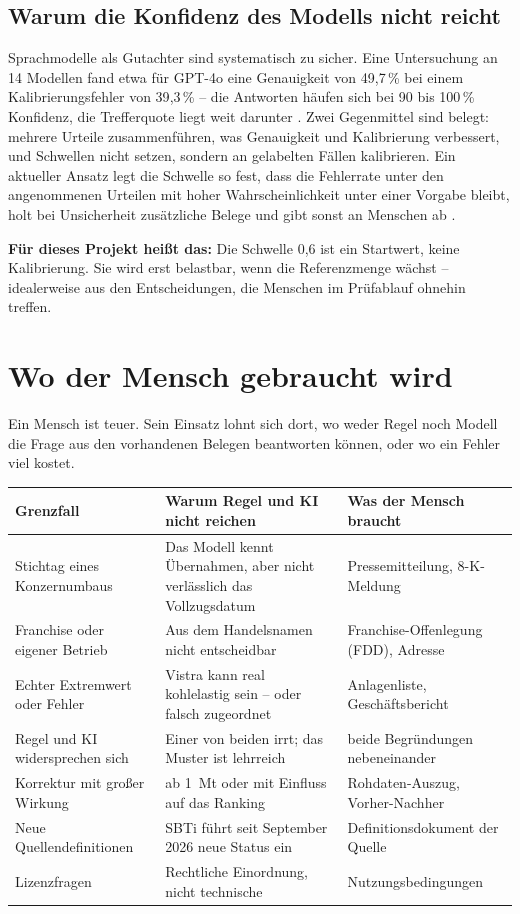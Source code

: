 \documentclass[11pt,a4paper]{article}
\newcommand{\befund}[1]{%
  \par\vspace{2pt}\noindent\colorbox{softgrey}{%
  \begin{minipage}{\dimexpr\linewidth-2\fboxsep}\small\vspace{3pt}#1\vspace{3pt}\end{minipage}}\par\vspace{4pt}}
\begin{document}
\subsection{Warum die Konfidenz des Modells nicht reicht}

Sprachmodelle als Gutachter sind systematisch zu sicher. Eine Untersuchung an 14 Modellen fand etwa für GPT-4o eine Genauigkeit von 49{,}7\,\% bei einem Kalibrierungsfehler von 39{,}3\,\% -- die Antworten häufen sich bei 90 bis 100\,\% Konfidenz, die Trefferquote liegt weit darunter \cite{overconf}. Zwei Gegenmittel sind belegt: mehrere Urteile zusammenführen, was Genauigkeit und Kalibrierung verbessert, und Schwellen nicht setzen, sondern an gelabelten Fällen kalibrieren. Ein aktueller Ansatz legt die Schwelle so fest, dass die Fehlerrate unter den angenommenen Urteilen mit hoher Wahrscheinlichkeit unter einer Vorgabe bleibt, holt bei Unsicherheit zusätzliche Belege und gibt sonst an Menschen ab \cite{judgeabstain}.

\befund{\textbf{Für dieses Projekt heißt das:} Die Schwelle 0{,}6 ist ein Startwert, keine Kalibrierung. Sie wird erst belastbar, wenn die Referenzmenge wächst -- idealerweise aus den Entscheidungen, die Menschen im Prüfablauf ohnehin treffen.}

\section{Wo der Mensch gebraucht wird}

Ein Mensch ist teuer. Sein Einsatz lohnt sich dort, wo weder Regel noch Modell die Frage aus den vorhandenen Belegen beantworten können, oder wo ein Fehler viel kostet.

\begin{center}\footnotesize
\begin{tabularx}{\textwidth}{P{3.6cm} X P{3.4cm}}
\toprule
\textbf{Grenzfall} & \textbf{Warum Regel und KI nicht reichen} & \textbf{Was der Mensch braucht} \\
\midrule
Stichtag eines Konzernumbaus & Das Modell kennt Übernahmen, aber nicht verlässlich das Vollzugsdatum & Pressemitteilung, 8-K-Meldung \\
Franchise oder eigener Betrieb & Aus dem Handelsnamen nicht entscheidbar & Franchise-Offenlegung (FDD), Adresse \\
Echter Extremwert oder Fehler & Vistra kann real kohlelastig sein -- oder falsch zugeordnet & Anlagenliste, Geschäftsbericht \\
Regel und KI widersprechen sich & Einer von beiden irrt; das Muster ist lehrreich & beide Begründungen nebeneinander \\
Korrektur mit großer Wirkung & ab 1~Mt oder mit Einfluss auf das Ranking & Rohdaten-Auszug, Vorher-Nachher \\
Neue Quellendefinitionen & SBTi führt seit September 2026 neue Status ein & Definitionsdokument der Quelle \\
Lizenzfragen & Rechtliche Einordnung, nicht technische & Nutzungsbedingungen \\
\bottomrule
\end{tabularx}
\end{center}
\end{document}
